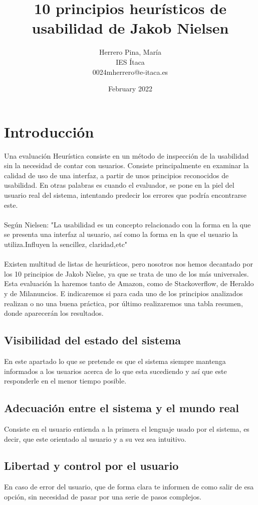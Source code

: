 \documentclass[openany,overnay,a4paper, twoside, 14pt]{book}
\title{\Huge10 principios heurísticos de usabilidad de Jakob Nielsen\\}
\author{
    Herrero Pina, María\\
    IES Ítaca\\
    0024mherrero@e-itaca.es\\
\date{February 2022}}
\begin{document}
\maketitle
\newpage
\tableofcontents
\rmfamily
\justify
\setcounter{chapter}{1}
\chapter*{Introducción}
Una evaluación Heurística consiste en un método de inspección de la usabilidad sin la necesidad de contar con usuarios. Consiste principalmente en examinar la calidad de uso de una interfaz, a partir de unos principios reconocidos de usabilidad. En otras palabras es cuando el evaluador, se pone en la piel del usuario real del sistema, intentando predecir los errores que podría encontrarse este.\\\\Según Nielsen: "La usabilidad es un concepto relacionado con la forma en la que se presenta una interfaz al usuario, así como la forma en la que el usuario la utiliza.Influyen la sencillez, claridad,etc" \\\\Existen multitud de listas de heurísticos, pero nosotros nos hemos decantado por los 10 principios de Jakob Nielse, ya que se trata de uno de los más universales. Esta evaluación la haremos tanto de Amazon, como de Stackoverflow, de Heraldo y de  Milanuncios. E indicaremos si para cada uno de los principios analizados realizan o no una buena práctica, por último realizaremos una tabla resumen, donde aparecerán los resultados.
\section*{Visibilidad del estado del sistema}
En este apartado lo que se pretende es que el sistema siempre mantenga informados a los usuarios acerca de lo que esta sucediendo y  así que este responderle en el menor tiempo posible.
\section*{Adecuación entre el sistema y el mundo real}
Consiste en el usuario entienda a la primera el lenguaje usado por el sistema, es decir, que este orientado al usuario y a su vez sea intuitivo.
\section*{Libertad y control por el usuario}
En caso de error del usuario, que de forma clara te informen de como salir de esa opción, sin necesidad de pasar por una serie de pasos complejos.
\end{document}
